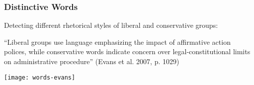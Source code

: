 \documentclass[11pt,compress,professionalfonts]{beamer}
\begin{document}
\begin{frame}[t,fragile]\frametitle{Distinctive Words}

Detecting different rhetorical styles of liberal and conservative groups:

``Liberal groups use language emphasizing the impact of affirmative action polices, while conservative words indicate concern over legal-constitutional limits on administrative procedure'' (Evans et al. 2007, p. 1029)

\newpage

\centerline{\texttt{[image: words-evans]}}
%
%
%
%
%
%
%
%
%
%
%
%
%
%

\end{frame}
\end{document}
